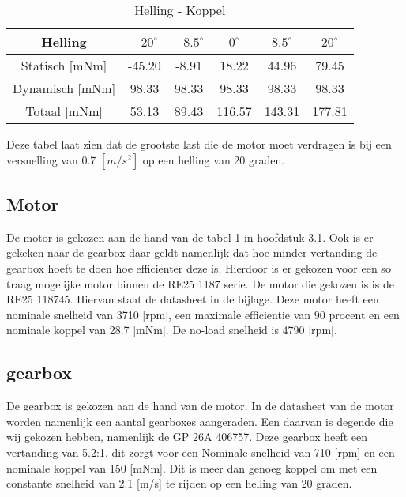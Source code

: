 \documentclass{article}
\begin{document}
        \begin{table}[h]
            \centering
            \begin{tabular}{|c|c|c|c|c|c|}
            \hline
            Helling & $-20 ^\circ$ & $-8.5 ^\circ$ & $0 ^\circ$ & $8.5 ^\circ$ & $20 ^\circ$ \\ \hline
            Statisch [mNm]  & -45.20   & -8.91   & 18.22   & 44.96  & 79.45   \\ \hline
            Dynamisch [mNm] & 98.33    & 98.33   & 98.33   & 98.33  & 98.33  \\ \hline
            Totaal [mNm] & 53.13  & 89.43   & 116.57  & 143.31  & 177.81  \\ \hline
            \end{tabular}
            \caption{Helling - Koppel}
            \label{tab}
        \end{table}
    
    Deze tabel laat zien dat de grootste last die de motor moet verdragen is bij  een versnelling van 0.7 $[m/s^2]$ op een helling van 20 graden.
        
    \subsection{Motor}
    De motor is gekozen aan de hand van de tabel 1 in hoofdstuk 3.1. 
    Ook is er gekeken naar de gearbox daar geldt namenlijk dat hoe minder vertanding de gearbox hoeft te doen hoe efficienter deze is. 
    Hierdoor is er gekozen voor een so traag mogelijke motor binnen de RE25 1187 serie.
    De motor die gekozen is is de RE25 118745.
    Hiervan staat de datasheet in de bijlage.
    Deze motor heeft een nominale snelheid van 3710 [rpm], een maximale efficientie van 90 procent en een nominale koppel van 28.7 [mNm].
    De no-load snelheid is 4790 [rpm].
    

    \subsection{gearbox}
    De gearbox is gekozen aan de hand van de motor. 
    In de datasheet van de motor worden namenlijk een aantal gearboxes aangeraden.
    Een daarvan is degende die wij gekozen hebben, namenlijk de GP 26A 406757. 
    Deze gearbox heeft een vertanding van 5.2:1. dit zorgt voor een Nominale snelheid van 710 [rpm] en een nominale koppel van 150 [mNm]. 
    Dit is meer dan genoeg koppel om met een constante snelheid van 2.1 [m/s] te rijden op een helling van 20 graden.
\end{document}
